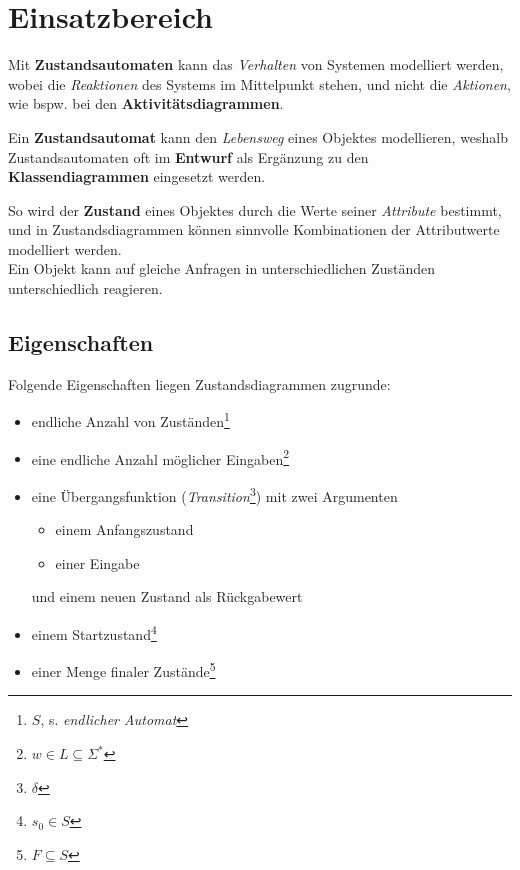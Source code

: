 \section{Einsatzbereich}

Mit \textbf{Zustandsautomaten} kann das \textit{Verhalten} von Systemen modelliert werden, wobei die \textit{Reaktionen} des Systems im Mittelpunkt stehen, und nicht die \textit{Aktionen}, wie bspw. bei den \textbf{Aktivitätsdiagrammen}.

\begin{tcolorbox}
    Ein \textbf{Zustandsautomat} kann den \textit{Lebensweg} eines Objektes modellieren, weshalb Zustandsautomaten oft im \textbf{Entwurf} als Ergänzung zu den \textbf{Klassendiagrammen} eingesetzt werden.
\end{tcolorbox}

\noindent
So wird der \textbf{Zustand} eines Objektes durch die Werte seiner \textit{Attribute} bestimmt, und in Zustandsdiagrammen können sinnvolle Kombinationen der Attributwerte modelliert werden.\\
Ein Objekt kann auf gleiche Anfragen in unterschiedlichen Zuständen unterschiedlich reagieren.\\

\subsection*{Eigenschaften}

Folgende Eigenschaften liegen Zustandsdiagrammen zugrunde:

\begin{itemize}
    \item endliche Anzahl von Zuständen\footnote{$S$, s. \textit{endlicher Automat}}
    \item eine endliche Anzahl möglicher Eingaben\footnote{$w \in L \subseteq \Sigma^*$}
    \item eine Übergangsfunktion (\textit{Transition}\footnote{$\delta$}) mit zwei Argumenten
    \begin{itemize}
        \item einem Anfangszustand
        \item einer Eingabe
    \end{itemize}
    \noindent
    und einem neuen Zustand als Rückgabewert
    \item einem Startzustand\footnote{$s_0 \in S$}
    \item einer Menge finaler Zustände\footnote{$F \subseteq S$}
\end{itemize}